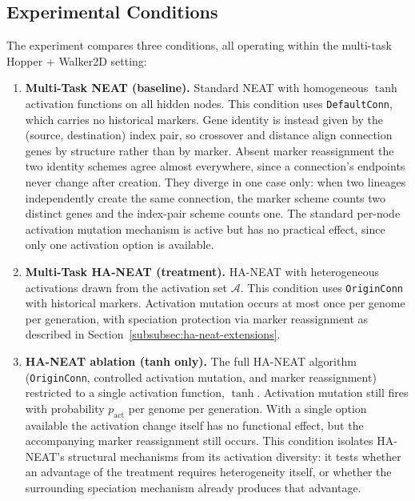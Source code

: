 \documentclass[12pt]{article}
\newcommand{\revClarity}[2]{#2}
\newcommand{\revTerm}[2]{#2}
\begin{document}
\subsection{Experimental Conditions}
\label{subsec:experimental-conditions}

The experiment compares three conditions, all operating within the multi-task Hopper + Walker2D setting:

\begin{enumerate}
    \item \textbf{Multi-Task NEAT (baseline).} Standard NEAT with homogeneous $\tanh$ activation functions on all hidden nodes. This condition uses \texttt{DefaultConn}, which carries no historical markers. Gene identity is instead given by the (source, destination) index pair, so crossover and distance align connection genes by structure rather than by marker. Absent marker reassignment the two identity schemes agree almost everywhere, since a connection's endpoints never change after creation. They diverge in one case only: when two lineages independently create the same connection, the marker scheme counts two distinct genes and the index-pair scheme counts one. The standard per-node activation mutation mechanism is active but has no practical effect, since only one activation option is available.

    \item \textbf{Multi-Task HA-NEAT (treatment).} HA-NEAT with heterogeneous activations \revTerm{T-08}{drawn from the activation set} $\mathcal{A}$. This condition uses \texttt{OriginConn} with historical markers. Activation mutation occurs at most once per genome per generation, with speciation protection via marker reassignment as described in Section~\ref{subsubsec:ha-neat-extensions}.

    \item \textbf{HA-NEAT ablation (tanh only).} The full HA-NEAT algorithm (\texttt{OriginConn}, controlled activation mutation, and marker reassignment) restricted to a single activation function, $\tanh$. Activation mutation still fires with probability $p_{\text{act}}$ per genome per generation. With a single option available the activation change itself has no functional effect, but the accompanying marker reassignment still occurs. %
This condition isolates HA-NEAT's structural mechanisms from its activation diversity: it tests whether an advantage of the treatment requires heterogeneity itself, \revClarity{L-04}{or whether the surrounding speciation mechanism already produces that advantage}.
\end{enumerate}
\end{document}
